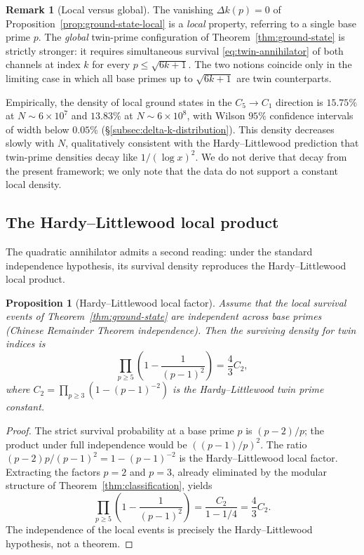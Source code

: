 \documentclass[11pt]{amsart}
\numberwithin{equation}{section}
\theoremstyle{plain}
\newtheorem{proposition}[theorem]{Proposition}
\theoremstyle{definition}
\newtheorem{remark}[theorem]{Remark}
\begin{document}
\begin{remark}[Local versus global]
\label{rem:ground-state-density}
The vanishing $\Delta k(p)=0$ of
Proposition~\ref{prop:ground-state-local} is a \emph{local}
property, referring to a single base prime $p$. The \emph{global}
twin-prime configuration of Theorem~\ref{thm:ground-state} is strictly
stronger: it requires simultaneous survival
\eqref{eq:twin-annihilator} of both channels at index $k$ for every
$p\le\sqrt{6k+1}$. The two notions coincide only in the limiting case
in which all base primes up to $\sqrt{6k+1}$ are twin counterparts.

Empirically, the density of local ground states in the
$C_5\to C_1$ direction is $15.75\%$ at $N\sim 6\times 10^7$ and
$13.83\%$ at $N\sim 6\times 10^8$, with Wilson $95\%$ confidence
intervals of width below $0.05\%$
(\S\ref{subsec:delta-k-distribution}). This density decreases slowly
with $N$, qualitatively consistent with the Hardy--Littlewood
prediction that twin-prime densities decay like $1/(\log x)^2$. We
do not derive that decay from the present framework; we only note
that the data do not support a constant local density.
\end{remark}

\subsection{The Hardy--Littlewood local product}
\label{subsec:hl}

The quadratic annihilator admits a second reading: under the standard
independence hypothesis, its survival density reproduces the
Hardy--Littlewood local product.

\begin{proposition}[Hardy--Littlewood local factor]
\label{thm:HL}
Assume that the local survival events of
Theorem~\ref{thm:ground-state} are independent across base primes
(Chinese Remainder Theorem independence). Then the surviving density
for twin indices is
\begin{equation}
\prod_{p\ge 5}\left(1-\frac{1}{(p-1)^2}\right)=\frac{4}{3}C_2,
\label{eq:hl-local}
\end{equation}
where $C_2=\prod_{p\ge 3}(1-(p-1)^{-2})$ is the Hardy--Littlewood twin
prime constant.
\end{proposition}

\begin{proof}
The strict survival probability at a base prime $p$ is $(p-2)/p$; the
product under full independence would be $((p-1)/p)^2$. The ratio
$(p-2)p/(p-1)^2=1-(p-1)^{-2}$ is the Hardy--Littlewood local factor.
Extracting the factors $p=2$ and $p=3$, already eliminated by the
modular structure of Theorem~\ref{thm:classification}, yields
\begin{equation*}
\prod_{p\ge 5}\left(1-\frac{1}{(p-1)^2}\right)
=\frac{C_2}{1-1/4}
=\frac{4}{3}C_2.
\end{equation*}
The independence of the local events is precisely the
Hardy--Littlewood hypothesis, not a theorem.
\end{proof}
\end{document}
